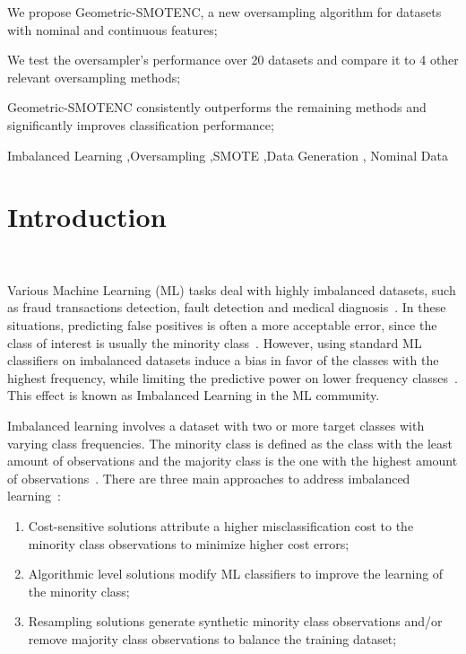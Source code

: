 \documentclass[preprint,12pt]{elsarticle}
\begin{document}
{\begin{frontmatter}
\begin{highlights}
    \item We propose Geometric-SMOTENC, a new oversampling algorithm for
        datasets with nominal and continuous features;
    \item We test the oversampler's performance over 20 datasets and compare
        it to 4 other relevant oversampling methods;
    \item Geometric-SMOTENC consistently outperforms the remaining methods and
        significantly improves classification performance;
\end{highlights}

\begin{keyword}
Imbalanced Learning \sep Oversampling \sep SMOTE \sep Data Generation \sep
Nominal Data
\end{keyword}

\end{frontmatter}

\linenumbers%

\section{Introduction}~\label{sec:introduction}

Various Machine Learning (ML) tasks deal with highly imbalanced datasets, such
as fraud transactions detection, fault detection and medical
diagnosis~\cite{tyagi2020sampling}. In these situations, predicting false
positives is often a more acceptable error, since the class of interest is
usually the minority class~\cite{vuttipittayamongkol2021class}. However, using
standard ML classifiers on imbalanced datasets induce a bias in favor of the
classes with the highest frequency, while limiting the predictive power on lower
frequency classes~\cite{lopez2013insight, das2018handling}. This effect is
known as Imbalanced Learning in the ML community. 

Imbalanced learning involves a dataset with two or more target classes with
varying class frequencies. The minority class is defined as the class with the
least amount of observations and the majority class is the one with the
highest amount of observations~\cite{kaur2019systematic}. There are three main
approaches to address imbalanced learning~\cite{fernandez2013analysing}: 

\begin{enumerate}
    \item Cost-sensitive solutions attribute a higher misclassification cost
        to the minority class observations to minimize higher cost errors;
    \item Algorithmic level solutions modify ML classifiers to improve the
        learning of the minority class;
    \item Resampling solutions generate synthetic minority class observations
        and/or remove majority class observations to balance the training
        dataset;
\end{enumerate}

}
\end{document}
